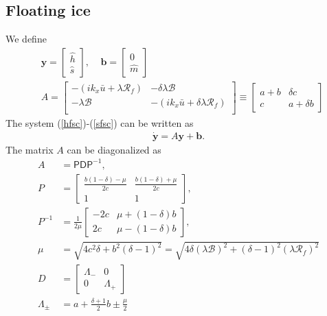 \documentclass[paper=a4, fontsize=11pt]{article}
\begin{document}
\subsection*{Floating ice}
We define
\begin{align}
&\pmb{y} = \begin{bmatrix}
\widehat{h} \\
\widehat{s}
\end{bmatrix}, \;\;\;\;
\pmb{b} =
\begin{bmatrix}
0\\
\widehat{m}
\end{bmatrix}\\
&{A} = \begin{bmatrix}
-(ik_x \bar{u}  + \lambda \mathcal{R}_f) & -\delta\lambda\mathcal{B} \\
-\lambda\mathcal{B} & -(ik_x \bar{u}  + \delta\lambda\mathcal{R}_f) \\
\end{bmatrix} \equiv
\begin{bmatrix}
a+b & \delta c \\
c & a+\delta b
\end{bmatrix}
\label{Amat}
\end{align}
The system (\ref{hfsc})-(\ref{sfsc}) can be written as
\begin{align}
\dot{\pmb{y}} = {A}\pmb{y} + \pmb{b}.
\end{align}
The matrix ${A}$ can be diagonalized as
\begin{align}
{A} &= \mathsf{P}\mathsf{D}\mathsf{P}^{-1},\\
{P} &= \begin{bmatrix}
\frac{b(1-\delta)-\mu}{2c} & \frac{b(1-\delta)+\mu}{2c} \\
1 & 1
\end{bmatrix},\\
{P}^{-1} &= \frac{1}{2\mu}\begin{bmatrix}
-2c &  \mu+(1-\delta)b \\
2c &  \mu-(1-\delta)b
\end{bmatrix},\\
\mu &= \sqrt{4c^2 \delta + b^2(\delta-1)^2} = \sqrt{4\delta(\lambda\mathcal{B})^2 + (\delta-1)^2(\lambda\mathcal{R}_f)^2 } \label{mu}\\
{D} &= \begin{bmatrix}
\Lambda_-  & 0 \\
0 & \Lambda_+
\end{bmatrix} \\
\Lambda_\pm &= a+\frac{\delta+1}{2}b \pm \frac{\mu}{2} \label{Lambda}
\end{align}
\end{document}
